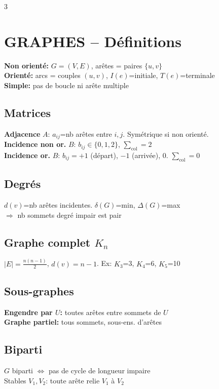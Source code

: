 \documentclass[a4paper,4pt]{article}
\begin{document}
\fontsize{4.5pt}{5.2pt}\selectfont

\begin{multicols}{3}

\section{GRAPHES -- D\'efinitions}

\textbf{Non orient\'e:} $G=(V,E)$, ar\^etes = paires $\{u,v\}$\\
\textbf{Orient\'e:} arcs = couples $(u,v)$, $I(e)$=initiale, $T(e)$=terminale\\
\textbf{Simple:} pas de boucle ni ar\^ete multiple

\subsection{Matrices}
\textbf{Adjacence} $A$: $a_{ij}$=nb ar\^etes entre $i,j$. Sym\'etrique si non orient\'e.\\
\textbf{Incidence non or.} $B$: $b_{ij}\in\{0,1,2\}$, $\sum_{\text{col}}=2$\\
\textbf{Incidence or.} $B$: $b_{ij}=+1$ (d\'epart), $-1$ (arriv\'ee), $0$. $\sum_{\text{col}}=0$

\subsection{Degr\'es}
$d(v)$=nb ar\^etes incidentes. $\delta(G)$=min, $\Delta(G)$=max\\
{\color{red}} $\Rightarrow$ nb sommets degr\'e impair est pair

\subsection{Graphe complet $K_n$}
$|E|=\frac{n(n-1)}{2}$, $d(v)=n-1$. Ex: $K_3$=3, $K_4$=6, $K_5$=10

\subsection{Sous-graphes}
\textbf{Engendre par $U$:} toutes ar\^etes entre sommets de $U$\\
\textbf{Graphe partiel:} tous sommets, sous-ens. d'ar\^etes

\subsection{Biparti}
$G$ biparti $\Leftrightarrow$ pas de cycle de longueur impaire\\
Stables $V_1,V_2$: toute ar\^ete relie $V_1$ \`a $V_2$


\end{multicols}
\end{document}
